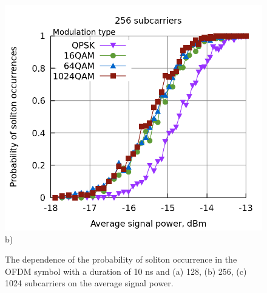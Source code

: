 \begin{figure}[htpb]
\begin{minipage}[h]{0.47\linewidth}
{            \includegraphics[width=1\linewidth]{images/soliton/10ns_ofdm_prob_256.png} b) \\
        }
    \end{minipage}
    \vfill

    \caption{The dependence of the probability of soliton occurrence in the OFDM symbol with a duration of 10 ns and (a) 128, (b) 256, (c) 1024 subcarriers on the average signal power.}
    \label{fig:ofdm_result_sub_all}
\end{figure}

